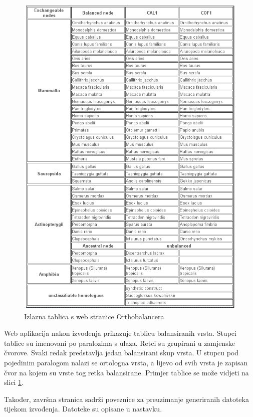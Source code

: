\begin{figure}[h!]
\centering
\includegraphics[width=5.4in]{figures/tablica.png}
\caption{Izlazna tablica s web stranice Orthobalancera}
\label{fig:tablica}
\end{figure}

Web aplikacija nakon izvođenja prikazuje tablicu balansiranih vrsta.  Stupci
tablice su imenovani po paralozima s ulaza. Retci su grupirani u zamjenske
čvorove. Svaki redak predstavlja jedan balansirani skup vrsta. U stupcu pod
pojedinim paralogom nalazi se ortologna vrsta, a lijevo od svih vrsta je zapisan
čvor na kojem su vrste tog retka balansirane. Primjer tablice se može vidjeti
na slici \ref{fig:tablica}.

Također, završna stranica sadrži poveznice za preuzimanje generiranih datoteka
tijekom izvođenja. Datoteke su opisane u nastavku.

